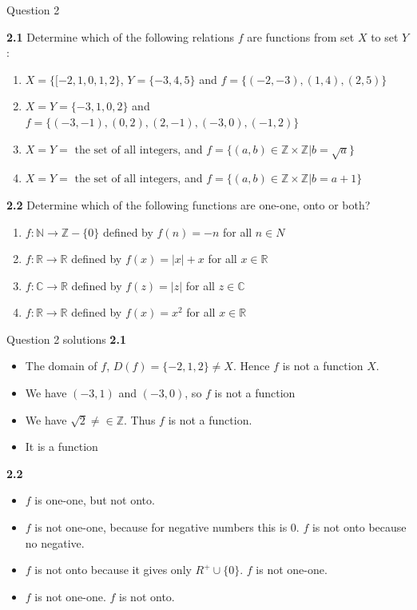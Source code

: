 \documentclass[xcolor=svgnames]{beamer}
\begin{document}
\begin{frame}{Question 2}
    \small{
        \textbf{2.1} Determine which of the following relations $f$ are functions from set $X$ to set $Y$:
        \begin{enumerate}
            \item $X = \{[-2, 1, 0, 1, 2\}$, $Y=\{-3, 4, 5\}$ and $f =\{(-2, -3), (1, 4), (2, 5)\}$
            \item $X = Y = \{-3, 1, 0, 2 \}$ and $f = \{(-3, -1), (0, 2), (2, -1), (-3, 0), (-1, 2)\}$
            \item $X = Y = \text{ the set of all integers}$, and $f = \{(a, b) \in \mathbb{Z} \times \mathbb{Z} | b = \sqrt{a}\}$
            \item $X = Y = \text{ the set of all integers}$, and $f = \{(a, b) \in \mathbb{Z} \times \mathbb{Z} | b = a + 1\}$
        \end{enumerate}
        \textbf{2.2} Determine which of the following functions are one-one, onto or both? 
        \begin{enumerate}
            \item $f: \mathbb{N} \rightarrow \mathbb{Z} - \{0\}$ defined by $f(n) = -n$ for all  $n \in N$
            \item $f: \mathbb{R} \rightarrow \mathbb{R}$ defined by $f(x) = |x| + x$ for all $x \in \mathbb{R}$
            \item $f: \mathbb{C} \rightarrow \mathbb{R}$ defined by $f(z) = |z|$ for all $z \in \mathbb{C}$
            \item $f: \mathbb{R} \rightarrow \mathbb{R}$ defined by $f(x) = x^2$ for all $x \in \mathbb{R}$
        \end{enumerate}
    }
\end{frame}

\begin{frame}{Question 2 solutions}
    \textbf{2.1}
    \begin{itemize}
        \item The domain of $f$, $D(f) = \{-2, 1, 2\} \neq X$. Hence $f$ is not a function $X$. 
        \item We have $(-3, 1)$ and $(-3, 0)$, so $f$ is not a function
        \item We have $\sqrt{2} \neq \in \mathbb{Z}$. Thus $f$ is not a function.
        \item It is a function
    \end{itemize}
    \textbf{2.2}
    \begin{itemize}
        \item $f$ is one-one, but not onto.
        \item $f$ is not one-one, because for negative numbers this is $0$. $f$ is not onto because no negative. 
        \item $f$ is not onto because it gives only $R^+ \cup \{0\}$. $f$ is not one-one.
        \item $f$ is not one-one. $f$ is not onto.
    \end{itemize}
\end{frame}
\end{document}
